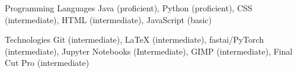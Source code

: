 


\begin{cvskills}


\cvskill
{Programming Languages} %
{Java (proficient), Python (proficient), CSS (intermediate), HTML (intermediate), JavaScript (basic)} %



\cvskill
{Technologies} %
{Git (intermediate), \textrm{\LaTeX} (intermediate),
fastai/PyTorch (intermediate), Jupyter Notebooks (Intermediate), GIMP (intermediate), Final Cut Pro (intermediate)} %





\end{cvskills}
